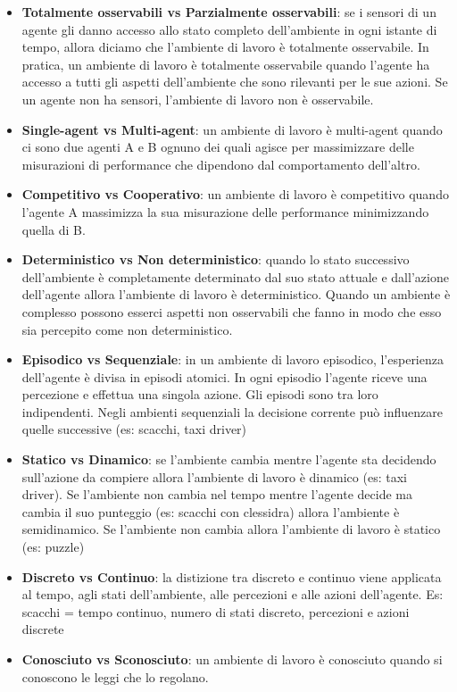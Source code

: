 \begin{itemize}
	\item \textbf{Totalmente osservabili vs Parzialmente osservabili}:
	      se i
	      sensori di un agente gli danno accesso allo stato completo dell'ambiente
	      in ogni istante di tempo, allora diciamo che l’ambiente di lavoro
	      è totalmente osservabile. In pratica, un ambiente di lavoro è totalmente
	      osservabile quando l’agente ha accesso a tutti gli aspetti dell’ambiente
	      che sono rilevanti per le sue azioni.
	      Se un agente non ha sensori, l’ambiente di lavoro non è osservabile.
	\item \textbf{Single-agent vs Multi-agent}:
	      un ambiente di lavoro è
	      multi-agent quando ci sono due agenti A e B ognuno dei quali agisce
	      per massimizzare delle misurazioni di performance che dipendono dal
	      comportamento dell’altro.
	\item \textbf{Competitivo vs Cooperativo}:
	      un ambiente di lavoro è
	      competitivo quando l’agente A massimizza la sua misurazione delle
	      performance minimizzando quella di B.
	\item \textbf{Deterministico vs Non deterministico}:
	      quando lo stato successivo dell’ambiente è completamente determinato dal suo stato attuale e dall’azione dell’agente allora l’ambiente di lavoro è deterministico. Quando un ambiente è complesso possono esserci aspetti non osservabili che fanno in modo che esso sia percepito come non deterministico.
	\item \textbf{Episodico vs Sequenziale}:
	      in un ambiente di lavoro episodico, l’esperienza dell’agente è divisa in episodi atomici. In ogni episodio l’agente riceve una percezione e effettua una singola azione. Gli episodi sono tra loro indipendenti. Negli ambienti sequenziali la decisione corrente può influenzare quelle successive (es: scacchi, taxi driver)
	\item \textbf{Statico vs Dinamico}:
	      se l’ambiente cambia mentre l’agente sta decidendo sull’azione da compiere allora l’ambiente di lavoro è dinamico (es: taxi driver). Se l’ambiente non cambia nel tempo mentre l’agente decide ma cambia il suo punteggio (es: scacchi con clessidra) allora l’ambiente è semidinamico. Se l’ambiente non cambia allora l’ambiente di lavoro è statico (es: puzzle)
	\item \textbf{Discreto vs Continuo}:
	      la distizione tra discreto e continuo viene applicata al tempo, agli stati dell’ambiente, alle percezioni e alle azioni dell’agente.
	      Es: scacchi = tempo continuo, numero di stati discreto, percezioni e azioni discrete
	\item \textbf{Conosciuto vs Sconosciuto}:
	      un ambiente di lavoro è conosciuto quando si conoscono le leggi che lo regolano.
\end{itemize}

